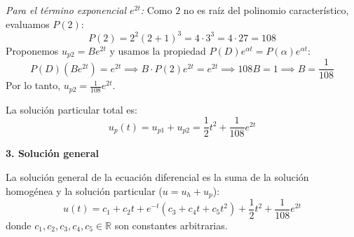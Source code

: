 {\begin{enumerate}
        \textit{Para el término exponencial $e^{2t}$:}
        Como $2$ no es raíz del polinomio característico, evaluamos $P(2)$:
        \[
            P(2) = 2^2 (2+1)^3 = 4 \cdot 3^3 = 4 \cdot 27 = 108
        \]
        Proponemos $u_{p2} = B e^{2t}$ y usamos la propiedad $P(D)e^{\alpha t} = P(\alpha)e^{\alpha t}$:
        \[
            P(D)(B e^{2t}) = e^{2t} \implies B \cdot P(2) e^{2t} = e^{2t} \implies 108 B = 1 \implies B = \frac{1}{108}
        \]
        Por lo tanto, $u_{p2} = \frac{1}{108}e^{2t}$.

        La solución particular total es:
        \[
            u_p(t) = u_{p1} + u_{p2} = \frac{1}{2}t^2 + \frac{1}{108}e^{2t}
        \]

        \textbf{3. Solución general}

        La solución general de la ecuación diferencial es la suma de la solución homogénea y la solución particular ($u = u_h + u_p$):
        \[
            u(t) = c_1 + c_2 t + e^{-t}(c_3 + c_4 t + c_5 t^2) + \frac{1}{2}t^2 + \frac{1}{108}e^{2t}
        \]
        donde $c_1, c_2, c_3, c_4, c_5 \in \mathbb{R}$ son constantes arbitrarias.
    \end{enumerate}
}


